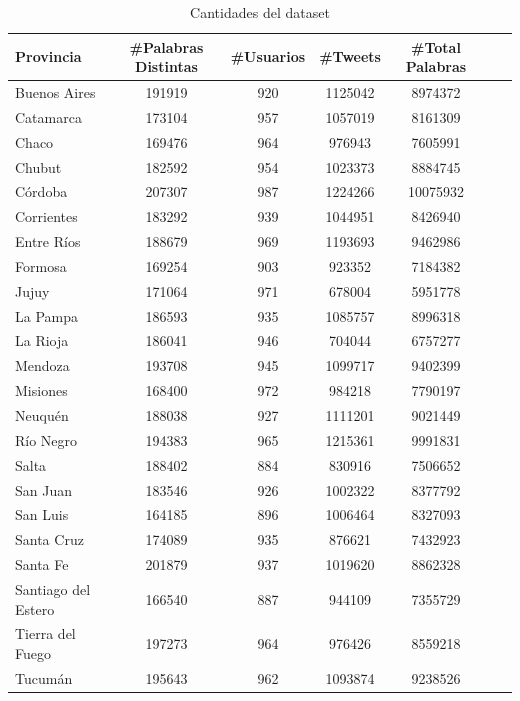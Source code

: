 \begin{table}[ht]
\centering

\label{tab:cantidades}
\begin{tabular}[width=0.7\textwidth]{|l|c|c|c|c|c|c|}
\hline
Provincia      & \#Palabras Distintas & \#Usuarios & \#Tweets & \#Total Palabras \\ \hline
Buenos Aires   & 191919       & 920          & 1125042    & 8974372  \\
Catamarca      & 173104       & 957          & 1057019    & 8161309   \\
Chaco          & 169476       & 964          & 976943     & 7605991   \\
Chubut         & 182592       & 954          & 1023373    & 8884745   \\
Córdoba        & 207307       & 987          & 1224266    & 10075932  \\
Corrientes     & 183292       & 939          & 1044951    & 8426940   \\
Entre Ríos     & 188679       & 969          & 1193693    & 9462986  \\
Formosa        & 169254       & 903          & 923352     & 7184382   \\
Jujuy          & 171064       & 971          & 678004     & 5951778   \\
La Pampa       & 186593       & 935          & 1085757    & 8996318  \\
La Rioja       & 186041       & 946          & 704044     & 6757277  \\
Mendoza        & 193708       & 945          & 1099717    & 9402399   \\
Misiones       & 168400       & 972          & 984218     & 7790197   \\
Neuquén        & 188038       & 927          & 1111201    & 9021449   \\
Río Negro      & 194383       & 965          & 1215361    & 9991831  \\
Salta          & 188402       & 884          & 830916     & 7506652   \\
San Juan       & 183546       & 926          & 1002322    & 8377792  \\
San Luis       & 164185       & 896          & 1006464    & 8327093  \\
Santa Cruz     & 174089       & 935          & 876621     & 7432923  \\
Santa Fe       & 201879       & 937          & 1019620    & 8862328  \\
Santiago del Estero       & 166540       & 887          & 944109     & 7355729  \\
Tierra del Fuego & 197273       & 964          & 976426     & 8559218   \\
Tucumán        & 195643       & 962          & 1093874    & 9238526 \\
  \hline
\end{tabular}
\caption{Cantidades del dataset}
\end{table}



